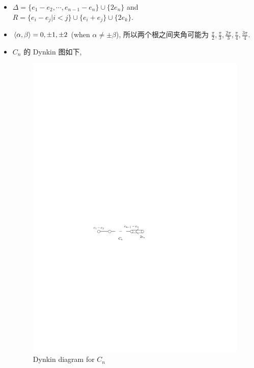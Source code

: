 \begin{itemize}
\begin{itemize}
		\item $\Delta = \{e_1 - e_2, \cdots, e_{n - 1} - e_n\} \cup \{2 e_n\}$ and $R = \{e_i - e_j | i < j\} \cup \{e_i + e_j\} \cup \{2 e_k\}$.
		
		\item $\braket{\alpha, \beta} = 0, \pm 1, \pm 2$ (when $\alpha \neq \pm \beta$), 所以两个根之间夹角可能为 $\frac{\pi}{2}, \frac{\pi}{3}, \frac{2 \pi}{3}, \frac{\pi}{4}, \frac{3 \pi}{4}$.
		
		\item $C_n$ 的 Dynkin 图如下,
		
		\begin{figure}[H]
			\centering
			\includegraphics[scale=1]{figures/Dynkin diagram for Cn.pdf}
			\caption{Dynkin diagram for $C_n$}
		\end{figure}
	\end{itemize}
\end{itemize}

